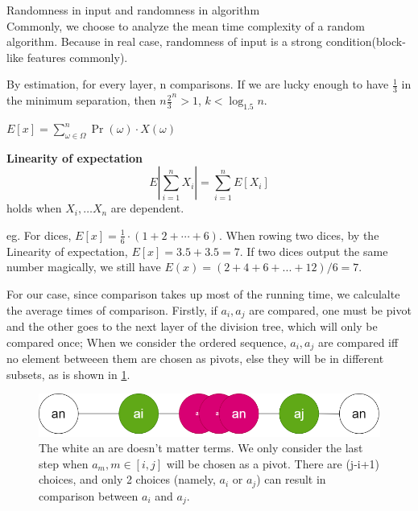 \begin{remark}
    Randomness in input and randomness in algorithm\\
    Commonly, we choose to analyze the mean time complexity of a random algorithm. 
    Because in real case, randomness of input is a strong condition(block-like features commonly).

    By estimation, for every layer, n comparisons. If we are lucky enough to have $\frac{1}{3}$ in the minimum separation, then $n\frac{2}{3}^n>1$, $k<\log_1.5n$.
    \begin{defi}
        $E[x]=\sum_{\omega \in \Omega}^{n} \Pr(\omega)\cdot X(\omega)  $
    \end{defi}
    \begin{thm}
        \textbf{Linearity of expectation}\\
        \[E| \sum_{i=1}^{n} X_i|=\sum_{i=1}^n E[X_i]\] 
        holds when $X_i,\ldots X_n$ are dependent.\\
    \end{thm}
    eg. For dices, $E[x]=\frac{1}{6}\cdot (1+2+\cdots+6)$. 
    When rowing two dices, by the Linearity of expectation, $E[x]=3.5+3.5=7$. If two dices output the same number magically, we still have $E(x)=(2+4+6+...+12)/6=7$.\\
\end{remark}

    For our case, since comparison takes up most of the running time, we calculalte the average times of comparison. Firstly, if $a_i,a_j$ are compared, one must be pivot and the other goes to the next layer of the division tree, which will only be compared once;
    When we consider the ordered sequence, $a_i, a_j$ are compared iff no element betweeen them are chosen as pivots, else they will be in different subsets, as is shown in \ref*{fig:randomComplexity}.
    \begin{figure}
        \centering
        \includegraphics[width=0.8\linewidth]{Notes/fig/ramdomComplexity.png}
        \caption{The white an are doesn't matter terms. We only consider the last step when $a_m , m \in [i,j]$ will be chosen as a pivot. There are (j-i+1) choices, and only 2 choices (namely, $a_i$ or $a_j$) can result in comparison between $a_i$ and $a_j$.}
        \label{fig:randomComplexity}
    \end{figure}
    
